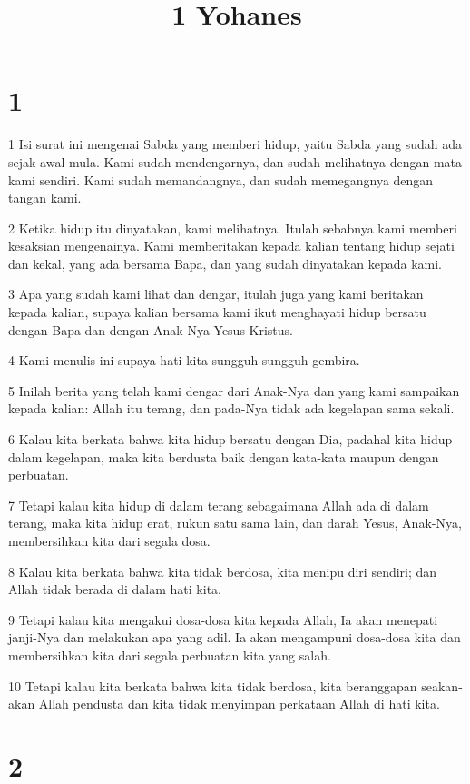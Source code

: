 

\title{1 Yohanes}


\chapter{1}

\par 1 Isi surat ini mengenai Sabda yang memberi hidup, yaitu Sabda yang sudah ada sejak awal mula. Kami sudah mendengarnya, dan sudah melihatnya dengan mata kami sendiri. Kami sudah memandangnya, dan sudah memegangnya dengan tangan kami.
\par 2 Ketika hidup itu dinyatakan, kami melihatnya. Itulah sebabnya kami memberi kesaksian mengenainya. Kami memberitakan kepada kalian tentang hidup sejati dan kekal, yang ada bersama Bapa, dan yang sudah dinyatakan kepada kami.
\par 3 Apa yang sudah kami lihat dan dengar, itulah juga yang kami beritakan kepada kalian, supaya kalian bersama kami ikut menghayati hidup bersatu dengan Bapa dan dengan Anak-Nya Yesus Kristus.
\par 4 Kami menulis ini supaya hati kita sungguh-sungguh gembira.
\par 5 Inilah berita yang telah kami dengar dari Anak-Nya dan yang kami sampaikan kepada kalian: Allah itu terang, dan pada-Nya tidak ada kegelapan sama sekali.
\par 6 Kalau kita berkata bahwa kita hidup bersatu dengan Dia, padahal kita hidup dalam kegelapan, maka kita berdusta baik dengan kata-kata maupun dengan perbuatan.
\par 7 Tetapi kalau kita hidup di dalam terang sebagaimana Allah ada di dalam terang, maka kita hidup erat, rukun satu sama lain, dan darah Yesus, Anak-Nya, membersihkan kita dari segala dosa.
\par 8 Kalau kita berkata bahwa kita tidak berdosa, kita menipu diri sendiri; dan Allah tidak berada di dalam hati kita.
\par 9 Tetapi kalau kita mengakui dosa-dosa kita kepada Allah, Ia akan menepati janji-Nya dan melakukan apa yang adil. Ia akan mengampuni dosa-dosa kita dan membersihkan kita dari segala perbuatan kita yang salah.
\par 10 Tetapi kalau kita berkata bahwa kita tidak berdosa, kita beranggapan seakan-akan Allah pendusta dan kita tidak menyimpan perkataan Allah di hati kita.

\chapter{2}

